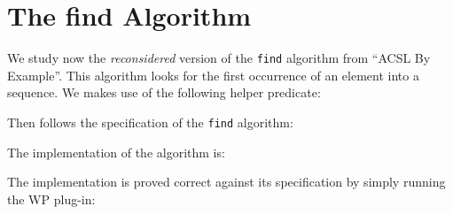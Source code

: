 \section{The \textsf{find} Algorithm}
\label{find}

We study now the \emph{reconsidered} version of the \texttt{find}
algorithm from ``ACSL By Example''.  This algorithm looks for the
first occurrence of an element into a sequence.  We makes use of the
following helper predicate:


Then follows the specification of the \texttt{find} algorithm:


The implementation of the algorithm is:


The implementation is proved correct against its specification by
simply running the \textsf{WP} plug-in: 

